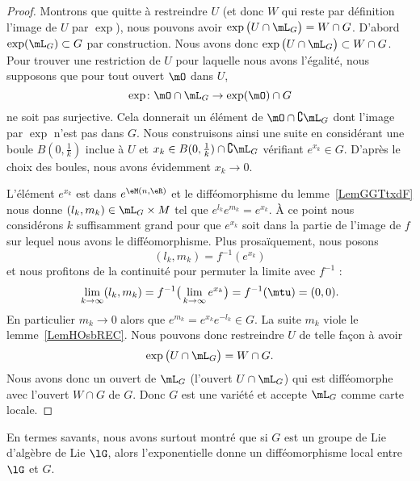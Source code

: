 \begin{proof}
	Montrons que quitte à restreindre \( U\) (et donc \( W\) qui reste par définition l'image de \( U\) par \( \exp\)), nous pouvons avoir \( \exp\big( U\cap\mL_G \big)=W\cap G\). D'abord \( \exp(\mL_G)\subset G\) par construction. Nous avons donc \( \exp\big( U\cap\mL_G \big)\subset W\cap G\). Pour trouver une restriction de \( U\) pour laquelle nous avons l'égalité, nous supposons que pour tout ouvert \( \mO\) dans \( U\),
	\begin{equation}
		\exp\colon \mO\cap\mL_G\to \exp(\mO)\cap G
	\end{equation}
	ne soit pas surjective. Cela donnerait un élément de \( \mO\cap\complement\mL_G\) dont l'image par \( \exp\) n'est pas dans \( G\). Nous construisons ainsi une suite en considérant une boule \( B(0,\frac{1}{ k })\) inclue à \( U\) et \( x_k\in B(0,\frac{1}{ k })\cap\complement\mL_G\) vérifiant \(  e^{x_k}\in G\). D'après le choix des boules, nous avons évidemment \( x_k\to 0\).

	L'élément \(  e^{x_k}\) est dans \(  e^{\eM(n,\eR)}\) et le difféomorphisme du lemme~\ref{LemGGTtxdF} nous donne \( (l_k,m_k)\in \mL_G\times M\) tel que \(  e^{l_k} e^{m_k}= e^{x_k}\). À ce point nous considérons \( k\) suffisamment grand pour que \(  e^{x_k}\) soit dans la partie de l'image de \( f\) sur lequel nous avons le difféomorphisme. Plus prosaïquement, nous posons
	\begin{equation}
		(l_k,m_k)=f^{-1}( e^{x_k})
	\end{equation}
	et nous profitons de la continuité pour permuter la limite avec \( f^{-1}\) :
	\begin{equation}
		\lim_{k\to \infty} (l_k,m_k)=f^{-1}\big( \lim_{k\to \infty}  e^{x_k} \big)=f^{-1}(\mtu)=(0,0).
	\end{equation}
	En particulier \( m_k\to 0\) alors que \(  e^{m_k}= e^{x_k} e^{-l_k}\in G\). La suite \( m_k\) viole le lemme~\ref{LemHOsbREC}. Nous pouvons donc restreindre \( U\) de telle façon à avoir
	\begin{equation}
		\exp\big( U\cap\mL_G \big)=W\cap G.
	\end{equation}
	Nous avons donc un ouvert de \( \mL_G\) (l'ouvert \( U\cap\mL_G\)) qui est difféomorphe avec l'ouvert \( W\cap G\) de \( G\). Donc \( G\) est une variété et accepte \( \mL_G\) comme carte locale.
\end{proof}

\begin{remark}
	En termes savants, nous avons surtout montré que si \( G\) est un groupe de Lie d'algèbre de Lie \( \lG\), alors l'exponentielle donne un difféomorphisme local entre \( \lG\) et \( G\).
\end{remark}

